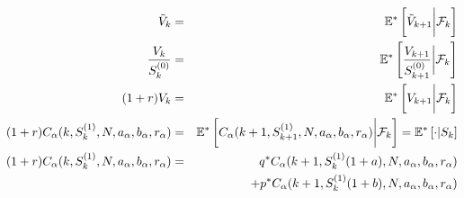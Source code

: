 \documentclass[12pt]{article}
\newenvironment{solution}[2][Solution]{\begin{trivlist}
\item[\hskip \labelsep {\bfseries #1}\hskip \labelsep {\bfseries #2.}]}{\end{trivlist}}
\newenvironment{question}[2][Question]{\begin{trivlist}
\item[\hskip \labelsep {\bfseries #1}\hskip \labelsep {\bfseries #2.}]}{\end{trivlist}}
\begin{document}
\begin{question}{8}
\end{question}
\begin{solution}[Solution]\\ 
\begin{eqnarray*}
\Tilde{V}_k &=& \mathbb{E}^* \left[\Tilde{V}_{k+1} \bigg| \mathcal{F}_k \right] \\
\frac{V_k}{S_k^{(0)}} &=& \mathbb{E}^* \left[\frac{V_{k+1}}{S_{k+1}^{(0)}} \bigg| \mathcal{F}_k \right] \\
(1+r) V_k &=& \mathbb{E}^* \left[V_{k+1} \bigg| \mathcal{F}_k \right] \\
(1+r) C_{\alpha}(k,S_k^{(1)},N,a_{\alpha},b_{\alpha},r_{\alpha}) &=& \mathbb{E}^* \left[C_{\alpha}(k+1,S_{k+1}^{(1)},N,a_{\alpha},b_{\alpha},r_{\alpha}) \bigg| \mathcal{F}_k \right] = \mathbb{E}^* \left[ \cdot | S_k \right]\\
(1+r) C_{\alpha}(k,S_k^{(1)},N,a_{\alpha},b_{\alpha},r_{\alpha}) &=& q^*C_{\alpha}(k+1,S_k^{(1)}(1+a),N,a_{\alpha},b_{\alpha},r_{\alpha}) \\
& & + p^* C_{\alpha}(k+1,S_k^{(1)}(1+b),N,a_{\alpha},b_{\alpha},r_{\alpha})
\end{eqnarray*}

\end{solution}
\end{document}

